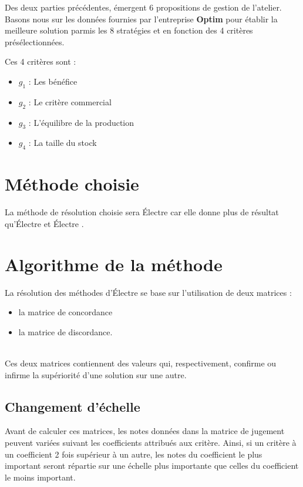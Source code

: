 
Des deux parties précédentes, émergent 6 propositions de gestion de l'atelier.\\
Basons nous sur les données fournies par l'entreprise \textbf{Optim} pour établir la meilleure solution parmis les 8 stratégies et en fonction des 4 critères présélectionnées.

Ces 4 critères sont :
\begin{itemize}
	\item $g_1$ : Les bénéfice
	\item $g_2$ : Le critère commercial
	\item $g_3$ : L'équilibre de la production
	\item $g_4$ : La taille du stock
\end{itemize}

\section{Méthode choisie}

La méthode de résolution choisie sera Électre  car elle donne plus de résultat qu'Électre  et Électre .

\section{Algorithme de la méthode}

La résolution des méthodes d'Électre se base sur l'utilisation de deux matrices : 
\begin{itemize}
	\item la matrice de concordance
	\item la matrice de discordance.
\end{itemize}
~\\
Ces deux matrices contiennent des valeurs qui, respectivement, confirme ou infirme la supériorité d'une solution sur une autre.\\

\subsection{Changement d'échelle}
Avant de calculer ces matrices, les notes données dans la matrice de jugement peuvent variées suivant les coefficients attribués aux critère. Ainsi, si un critère à un coefficient 2 fois supérieur à un autre, les notes du coefficient le plus important seront répartie sur une échelle plus importante que celles du coefficient le moins important.

